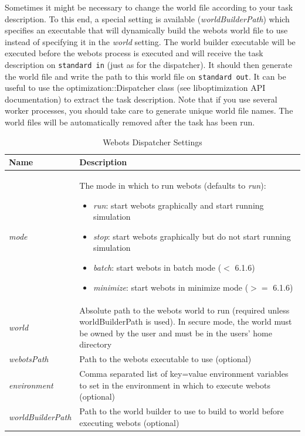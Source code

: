 \documentclass{article}
\begin{document}
Sometimes it might be necessary to change the world file according to your task
description. To this end, a special setting is available (\textit{worldBuilderPath})
which specifies an executable that will dynamically build the webots world
file to use instead of specifying it in the \textit{world} setting. The
world builder executable will be executed before the webots process is executed
and will receive the task description on \verb!standard in!
(just as for the dispatcher). It should then generate the world file and 
write the path to this world file on \verb!standard out!. It can be useful
to use the optimization::Dispatcher class (see liboptimization API 
documentation) to extract the task description. Note that if you use several
worker processes, you should take care to generate unique world file names.
The world files will be automatically removed after the task has been run.

\begin{table}[h!tb]\caption{Webots Dispatcher Settings}\label{tab:webots_settings}\vspace{0.1in}
	\centering

	\begin{tabular}{p{3cm} p{10cm}}
		\toprule
		\textbf{Name} & \textbf{Description} \\
		\midrule
		\textit{mode} & The mode in which to run webots (defaults to \textit{run}):
		\begin{itemize}
			\item \textit{run}: start webots graphically and start running simulation
			\item \textit{stop}: start webots graphically but do not start running simulation
			\item \textit{batch}: start webots in batch mode ($<$ 6.1.6)
			\item \textit{minimize}: start webots in minimize mode ($>=$ 6.1.6)
		\end{itemize} \\
		\textit{world} & Absolute path to the webots world to run (required 
		                 unless worldBuilderPath is used). In secure mode, the
		                 world must be owned by the user and must be in
		the users' home directory \\
		\textit{webotsPath} & Path to the webots executable to use (optional) \\
		\textit{environment} & Comma separated list of key=value environment variables
		              to set in the environment in which to execute webots
		              (optional) \\
		\textit{worldBuilderPath} & Path to the world builder to use to build to world
		                   before executing webots (optional)
		\bottomrule
	\end{tabular}
\end{table}

\newpage



\end{document}

